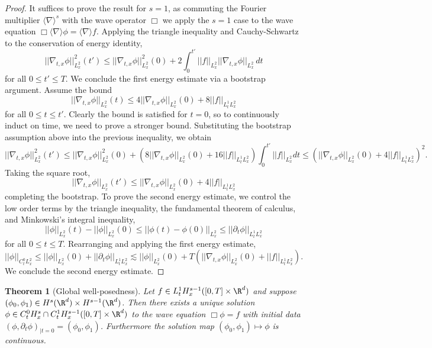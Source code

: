 \documentclass[reqno]{amsart}
\newtheorem{theorem}{Theorem}
\theoremstyle{definition}
\theoremstyle{remark}
\begin{document}
\begin{proof}
	It suffices to prove the result for $s = 1$, as commuting the Fourier multiplier $\langle \nabla \rangle^s$ with the wave operator $\Box$ we apply the $s = 1$ case to the wave equation  $\Box \langle \nabla \rangle \phi = \langle \nabla \rangle f$. Applying the triangle inequality and Cauchy-Schwartz to the conservation of energy identity,
		\[ ||\nabla_{t, x} \phi||_{L^2_x}^2 (t') \leq  ||\nabla_{t, x} \phi ||_{L^2_x}^2 (0) + 2\int_{0}^{t'} ||f ||_{L^2_x} ||\nabla_{t, x} \phi||_{L^2_x} \, dt \]
	for all $0 \leq t' \leq T$. We conclude the first energy estimate via a bootstrap argument. Assume the bound
		\[||\nabla_{t, x} \phi||_{L^2_x} (t) \leq  4 ||\nabla_{t, x} \phi ||_{L^2_x} (0) + 8 ||f||_{L^1_t L^2_x}  \]	
	for all $0 \leq t \leq t'$. Clearly the bound is satisfied for $t = 0$, so to continuously induct on time, we need to prove a stronger bound. Substituting the bootstrap assumption above into the previous inequality, we obtain
		\[ ||\nabla_{t, x} \phi||_{L^2_x}^2 (t') \leq  ||\nabla_{t, x} \phi ||_{L^2_x}^2 (0) +  \left( 8||\nabla_{t, x} \phi||_{L^2_x} (0) + 16 ||f||_{L^1_t L^2_x} \right) \int_0^{t'} ||f||_{L^2_x} dt \leq \left( ||\nabla_{t, x} \phi||_{L^2_x} (0) + 4||f||_{L^1_t L^2_x} \right)^2. \]	
	Taking the square root, 
		\[  ||\nabla_{t, x} \phi||_{L^2_x} (t') \leq ||\nabla_{t, x} \phi||_{L^2_x} (0) + 4||f||_{L^1_t L^2_x}\]
	completing the bootstrap. To prove the second energy estimate, we control the low order terms by the triangle inequality, the fundamental theorem of calculus, and Minkowski's integral inequality,
		\[ ||\phi ||_{L^2_x} (t) - ||\phi||_{L^2_x} (0) \leq ||\phi(t) - \phi(0)||_{L^2_x} \leq || \partial_t \phi||_{L^1_t L^2_x} \]
	for all $0 \leq t \leq T$. Rearranging and applying the first energy estimate, 
		\[ ||\phi||_{C^0_t L^2_x} \leq  ||\phi||_{L^2_x} (0) + || \partial_t \phi||_{L^1_t L^2_x} \lesssim  ||\phi||_{L^2_x} (0) + T \left( ||\nabla_{t, x} \phi||_{L^2_x} (0) + ||f||_{L^1_t L^2_x} \right). \]
	We conclude the second energy estimate. 
\end{proof}

\begin{theorem}[Global well-posedness]
	Let $f \in L^1_t H^{s -1}_x ([0, T] \times \R^d)$ and suppose $(\phi_0, \phi_1) \in H^s (\R^d) \times H^{s - 1} (\R^d)$. Then there exists a unique solution $\phi \in C^0_t H^s_x  \cap C^1_t H^{s - 1}_x ([0, T] \times \R^d)$ to the wave equation $\Box \phi = f$ with initial data $(\phi, \partial_t \phi)_{|t = 0} = (\phi_0, \phi_1)$. Furthermore the solution map $(\phi_0, \phi_1) \mapsto \phi$ is continuous. 
\end{theorem}
\end{document}
